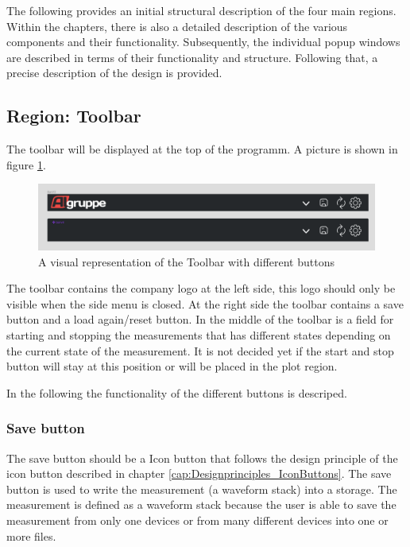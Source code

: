 \documentclass[]{scrreprt}
\begin{document}
The following provides an initial structural description of the four main regions. Within the chapters, there is also a detailed description of the various components and their functionality. Subsequently, the individual popup windows are described in terms of their functionality and structure. Following that, a precise description of the design is provided.

\subsection{Region: Toolbar}

The toolbar will be displayed at the top of the programm. 
A picture is shown in figure \ref{fig: toolbar}. 
\begin{figure}
    \includegraphics[width=.9\textwidth]{assets/pictures/Toolbar states.png}
    \caption[]{A visual representation of the Toolbar with different buttons}
    \label{fig: toolbar}
\end{figure}
The toolbar contains the company logo at the left side, this logo should only be visible when the side menu is closed. 
At the right side the toolbar contains a save button and a load again/reset button. 
In the middle of the toolbar is a field for starting and stopping the measurements that has different states depending on the current state of the measurement. It is not decided yet if the start and stop button will stay at this position or will be placed in the plot region. 

In the following the functionality of the different buttons is descriped. 

\subsubsection{Save button}

The save button should be a Icon button that follows the design principle of the icon button described in chapter \ref{cap:Designprinciples_IconButtons}. 
The save button is used to write the measurement (a waveform stack) into a storage. 
The measurement is defined as a waveform stack because the user is able to save the measurement from only one devices or from many different devices into one or more files.
\end{document}
